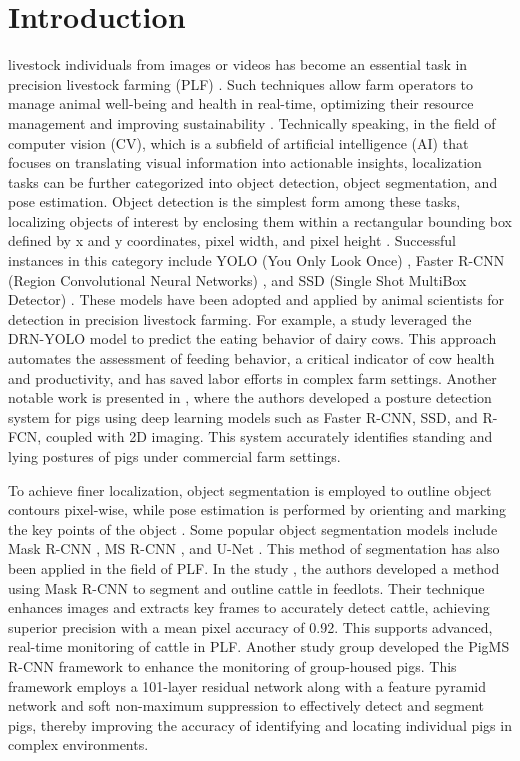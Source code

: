 \section{Introduction}
\label{sec:introduction}
 livestock individuals from images or videos has become an essential task in precision livestock farming (PLF) \cite{fernandes2020image}. Such techniques allow farm operators to manage animal well-being and health in real-time, optimizing their resource management and improving sustainability \cite{morrone2022industry, hao2023cattle}. Technically speaking, in the field of computer vision (CV), which is a subfield of artificial intelligence (AI) that focuses on translating visual information into actionable insights, localization tasks can be further categorized into object detection, object segmentation, and pose estimation. Object detection is the simplest form among these tasks, localizing objects of interest by enclosing them within a rectangular bounding box defined by x and y coordinates, pixel width, and pixel height \cite{viola2001rapid}. Successful instances in this category include YOLO (You Only Look Once) \cite{redmon2016you}, Faster R-CNN (Region Convolutional Neural Networks) \cite{girshick2015fast}, and SSD (Single Shot MultiBox Detector) \cite{liu2016ssd}. These models have been adopted and applied by animal scientists for detection in precision livestock farming. For example, a study \cite{yu2022automatic} leveraged the DRN-YOLO model \cite{xu2020improved} to predict the eating behavior of dairy cows. This approach automates the assessment of feeding behavior, a critical indicator of cow health and productivity, and has saved labor efforts in complex farm settings. Another notable work is presented in \cite{nasirahmadi2019deep}, where the authors developed a posture detection system for pigs using deep learning models such as Faster R-CNN, SSD, and R-FCN, coupled with 2D imaging. This system accurately identifies standing and lying postures of pigs under commercial farm settings.

To achieve finer localization, object segmentation is employed to outline object contours pixel-wise, while pose estimation is performed by orienting and marking the key points of the object \cite{hariharan2015hypercolumns}. Some popular object segmentation models include Mask R-CNN \cite{he2017mask}, MS R-CNN \cite{huang2019mask}, and U-Net \cite{siddique2021u}. This method of segmentation has also been applied in the field of PLF. In the study \cite{noe2022automatic}, the authors developed a method using Mask R-CNN \cite{he2017mask} to segment and outline cattle in feedlots. Their technique enhances images and extracts key frames to accurately detect cattle, achieving superior precision with a mean pixel accuracy of 0.92. This supports advanced, real-time monitoring of cattle in PLF. Another study group \cite{tu2021automatic} developed the PigMS R-CNN framework \cite{huang2019mask} to enhance the monitoring of group-housed pigs. This framework employs a 101-layer residual network along with a feature pyramid network and soft non-maximum suppression to effectively detect and segment pigs, thereby improving the accuracy of identifying and locating individual pigs in complex environments.

